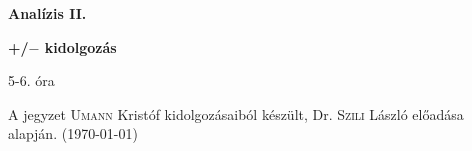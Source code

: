 \documentclass[a4paper,11.5pt]{article}
\begin{document}
	\setlength\parindent{0pt}
	\def\s{\hspace{0.2mm}\vphantom{\beta}}
	\def\Z{\mathbb{Z}}
	\def\Q{\mathbb{Q}}
	\def\R{\mathbb{R}}
	\def\C{\mathbb{C}}
	\def\N{\mathbb{N}}
	\def\Ra{\overline{\mathbb{R}}}
	
	\def\sume{\displaystyle\sum_{n=1}^{+\infty}}
	\def\sumn{\displaystyle\sum_{n=0}^{+\infty}}
	
	\def\narrow{\underset{n\rightarrow+\infty}{\longrightarrow}}
	\def\limn{\displaystyle\lim_{n\to +\infty}}
	\def\limx{\displaystyle\lim_{x\to +\infty}}
	
	\theoremstyle{definition}
	\newtheorem{theorem}{Tétel}[subsection] 
	
	\theoremstyle{definition}
	\newtheorem{definition}[theorem]{Definíció} 
	\newtheorem{example}[theorem]{Példa} 
	\newtheorem{task}[theorem]{Feladat} 
	\newtheorem{note}[theorem]{Megjegyzés}
	\begin{center}
		{\LARGE \textbf{Analízis II.}}
		
		{\large \textbf{+/$-$ kidolgozás}}
		
		5-6. óra
	\end{center}
	A jegyzet \textsc{Umann} Kristóf kidolgozásaiból készült, Dr. \textsc{Szili} László előadása alapján. (\today)
	
\end{document}
